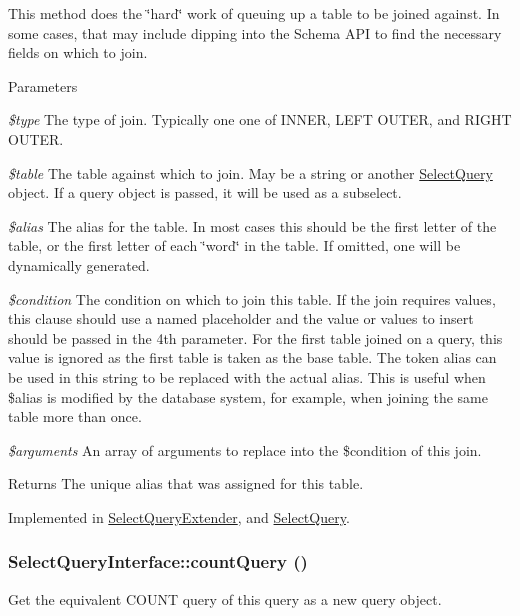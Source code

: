 This method does the \char`\"{}hard\char`\"{} work of queuing up a table to be joined against. In some cases, that may include dipping into the Schema API to find the necessary fields on which to join.


\begin{DoxyParams}{Parameters}
\item[{\em \$type}]The type of join. Typically one one of INNER, LEFT OUTER, and RIGHT OUTER. \item[{\em \$table}]The table against which to join. May be a string or another \hyperlink{classSelectQuery}{SelectQuery} object. If a query object is passed, it will be used as a subselect. \item[{\em \$alias}]The alias for the table. In most cases this should be the first letter of the table, or the first letter of each \char`\"{}word\char`\"{} in the table. If omitted, one will be dynamically generated. \item[{\em \$condition}]The condition on which to join this table. If the join requires values, this clause should use a named placeholder and the value or values to insert should be passed in the 4th parameter. For the first table joined on a query, this value is ignored as the first table is taken as the base table. The token alias can be used in this string to be replaced with the actual alias. This is useful when \$alias is modified by the database system, for example, when joining the same table more than once. \item[{\em \$arguments}]An array of arguments to replace into the \$condition of this join. \end{DoxyParams}
\begin{DoxyReturn}{Returns}
The unique alias that was assigned for this table. 
\end{DoxyReturn}


Implemented in \hyperlink{classSelectQueryExtender_ad6b6dd29f9c4de6129030be8d110d6ee}{SelectQueryExtender}, and \hyperlink{classSelectQuery_ad4a44826400c0a880129e009cbdea2d2}{SelectQuery}.\hypertarget{interfaceSelectQueryInterface_a48fd44b77e75771af6d3f289502f050e}{
\subsubsection[{countQuery}]{\setlength{\rightskip}{0pt plus 5cm}SelectQueryInterface::countQuery ()}}
\label{interfaceSelectQueryInterface_a48fd44b77e75771af6d3f289502f050e}
Get the equivalent COUNT query of this query as a new query object.

